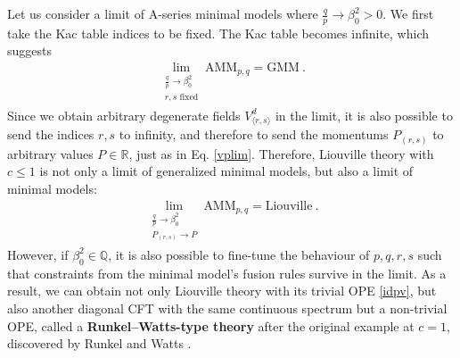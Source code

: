 \documentclass[12pt, a4paper]{article}
\theoremstyle{break}
\begin{document}
Let us consider a limit of A-series minimal models where $\frac{q}{p}\to \beta_0^2>0$. We first take the Kac table indices to be fixed. 
The Kac table becomes infinite, which suggests 
\begin{align}
 \lim_{\substack{\frac{q}{p}\to \beta_0^2\\ r,s\text{ fixed}}} \text{AMM}_{p,q} = \text{GMM}\ . 
 \label{mm-gmm}
\end{align}
Since we obtain arbitrary degenerate fields $V^d_{\langle r,s\rangle}$ in the limit, it is also possible to send the indices $r,s$ to infinity, and therefore to send the momentums $P_{(r,s)}$ to arbitrary values $P\in\mathbb{R}$, just as in Eq. \eqref{vplim}. Therefore, Liouville theory with $c\leq 1$ is not only a limit of generalized minimal models, but also a limit of minimal models:
\begin{align}
 \lim_{\substack{\frac{q}{p}\to \beta_0^2\\ P_{(r,s)}\to P}} \text{AMM}_{p,q} = \text{Liouville}\ . 
 \label{mm-liou}
\end{align}
However, if $\beta_0^2\in\mathbb{Q}$, it is also possible to fine-tune the behaviour of $p,q,r,s$ such that constraints from the minimal model's fusion rules survive in the limit. As a result, we can obtain not only Liouville theory with its trivial OPE \eqref{idpv}, but also another diagonal CFT with the same continuous spectrum but a non-trivial OPE, called a \textbf{Runkel--Watts-type theory} after the original example at $c=1$, discovered by Runkel and Watts \cite{rw01}. 
\end{document}
